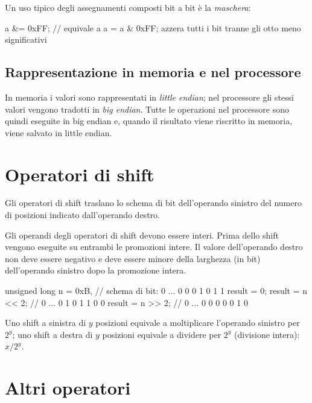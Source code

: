 \documentclass[11pt,a4paper]{article}
\begin{document}
Un uso tipico degli assegnamenti composti bit a bit è la \emph{maschera}:
\begin{codice}
a &= 0xFF;    // equivale a a = a & 0xFF; azzera tutti i bit tranne gli otto meno significativi
\end{codice}

\subsection{Rappresentazione in memoria e nel processore}

In memoria i valori sono rappresentati in \emph{little endian}; nel processore gli stessi valori vengono tradotti in \emph{big endian}. Tutte le operazioni nel processore sono quindi eseguite in big endian e, quando il risultato viene riscritto in memoria, viene salvato in little endian.

\section{Operatori di shift}

Gli operatori di shift traslano lo schema di bit dell'operando sinistro del numero di posizioni indicato dall'operando destro.

Gli operandi degli operatori di shift devono essere interi. Prima dello shift vengono eseguite su entrambi le promozioni intere. Il valore dell'operando destro non deve essere negativo e deve essere minore della larghezza (in bit) dell'operando sinistro dopo la promozione intera.

\begin{esempio}
\begin{codice}
unsigned long n = 0xB,   // schema di bit: 0 ... 0 0 0 1 0 1 1
              result = 0;
result = n << 2;         // 0 ... 0 1 0 1 1 0 0
result = n >> 2;         // 0 ... 0 0 0 0 0 1 0
\end{codice}
\end{esempio}

\begin{osservazione}
Uno shift a sinistra di $y$ posizioni equivale a moltiplicare l'operando sinistro per $2^{y}$; uno shift a destra di $y$ posizioni equivale a dividere per $2^{y}$ (divisione intera): $x / 2^{y}$.
\end{osservazione}

\section{Altri operatori}
\end{document}
